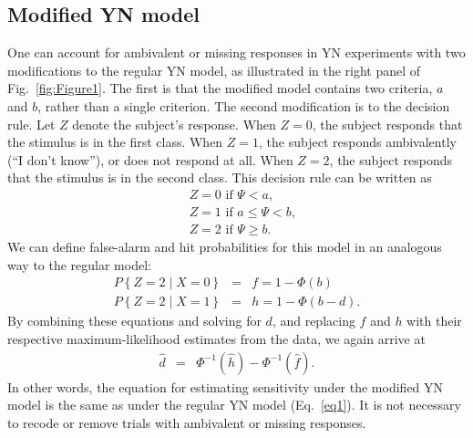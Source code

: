 \documentclass[man]{apa6}
\begin{document}
\subsection{Modified YN model}
One can account for ambivalent or missing responses in YN experiments with two modifications to the regular YN model, as illustrated in the right panel of Fig.~\ref{fig:Figure1}. The first is that the modified model contains two criteria, $a$ and $b$, rather than a single criterion. The second modification is to the decision rule. Let $Z$ denote the subject's response. When $Z=0$, the subject responds that the stimulus is in the first class. When $Z=1$, the subject responds ambivalently (``I don't know''), or does not respond at all. When $Z=2$, the subject responds that the stimulus is in the second class. This decision rule can be written as
\begin{eqnarray*}
&Z=0\textrm{ if }\Psi<a\textrm{,}\\
&Z=1\textrm{ if }a\le\Psi<b\textrm{,}\\
&Z=2\textrm{ if }\Psi\ge{}b\textrm{.}
\end{eqnarray*} 
We can define false-alarm and hit probabilities for this model in an analogous way to the regular model:
\begin{eqnarray*}
P\left\{Z=2\mid{}X=0\right\}&=&f=1-\Phi\left(b\right)\\
P\left\{Z=2\mid{}X=1\right\}&=&h=1-\Phi\left(b-d\right)\textrm{.}
\end{eqnarray*}
By combining these equations and solving for $d$, and replacing $f$ and $h$ with their respective maximum-likelihood estimates from the data, we again arrive at
\begin{eqnarray*}
\hat{d}&=&\Phi^{-1}\left(\hat{h}\right)-\Phi^{-1}\left(\hat{f}\right)\textrm{.}
\end{eqnarray*}In other words, the equation for estimating sensitivity under the modified YN model is the same as under the regular YN model (Eq.~\ref{eq1}). It is not necessary to recode or remove trials with ambivalent or missing responses.
\end{document}
